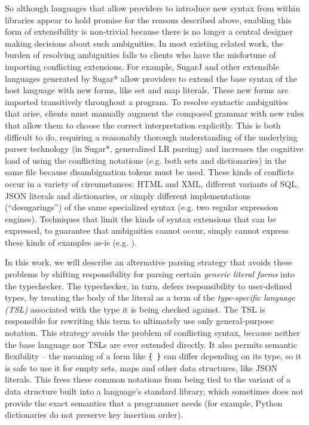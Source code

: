 So although languages that allow providers to introduce new syntax from within libraries appear to hold promise for the reasons described above, enabling this form of extensibility is non-trivial because there is no longer a central designer making decisions about such ambiguities. In most existing related work, the burden of resolving ambiguities falls to clients who have the misfortune of importing conflicting extensions. For example, SugarJ \cite{erdweg2011sugarj} and other extensible languages generated by Sugar* \cite{Erdweg:2013:FEL:2517208.2517210} allow providers to extend the base syntax of the host language with new forms, like set and map literals. These new forms are imported transitively throughout a program. To resolve syntactic ambiguities that arise, clients must manually augment the composed grammar with new rules that allow them to choose the correct interpretation explicitly. This is both difficult to do, requiring a reasonably thorough understanding of the underlying parser technology (in Sugar*, generalized LR parsing) and increases the cognitive load of using the conflicting notations (e.g. both sets and dictionaries) in the same file because disambiguation tokens must be used. These kinds of conflicts occur in a variety of circumstances: HTML and XML, different variants of SQL, JSON literals and dictionaries, or simply different implementations (``desugarings'') of the same specialized syntax (e.g. two regular expression engines). Techniques that limit the kinds of syntax extensions that can be expressed, to guarantee that ambiguities cannot occur, simply cannot express these kinds of examples as-is (e.g. \cite{Schwerdfeger:2009:VCD:1542476.1542499}).

In this work, we will describe an alternative parsing strategy that avoids these problems by shifting responsibility for parsing certain \emph{generic literal forms} into the typechecker. The typechecker, in turn, defers responsibility to user-defined types, by treating the body of the literal as a term of the   \emph{type-specific language (TSL)} associated with the type it is being checked against. The TSL is responsible for rewriting this term to ultimately use only general-purpose notation. This strategy avoids the problem of conflicting syntax, because neither the base language nor TSLs are ever extended directly. It also permits semantic flexibility -- the meaning of a form like \verb|{ }| can differ depending  on its type, so it is safe to use it for empty sets, maps and other data structures, like JSON literals. This frees these common notations from being tied to the variant of a  data structure built into a language's standard library, which sometimes does not provide the exact semantics that a programmer needs (for example, Python dictionaries do not preserve key insertion order).

